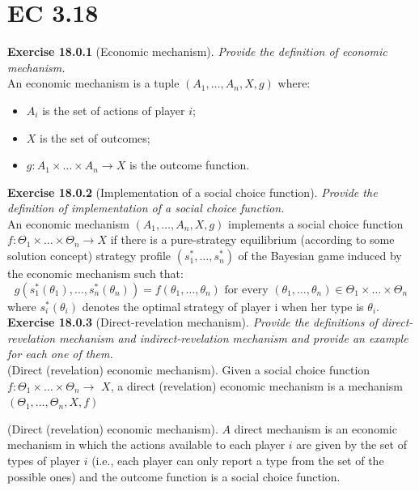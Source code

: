 \section{EC 3.18}

\textbf{Exercise 18.0.1} (Economic mechanism). \textit{Provide the definition of economic mechanism.}\\

An economic mechanism is a tuple $(A_1,\ldots,A_n,X,g)$ where:
\begin{itemize}
\item $A_i$ is the set of actions of player $i$;
\item $X$ is the set of outcomes;
\item $g: A_1 \times \ldots \times A_n\rightarrow X$ is the outcome function.
\end{itemize} 

\textbf{Exercise 18.0.2} (Implementation of a social choice function). \textit{Provide the definition of implementation of a social choice function.}\\

An economic mechanism $\left(A_{1}, \ldots, A_{n}, X, g\right)$ implements a social choice function $f: \Theta_{1} \times \ldots \times \Theta_{n} \rightarrow X$ if there is a pure-strategy equilibrium (according to
some solution concept) strategy profile $\left(s_{1}^{*}, \ldots, s_{n}^{*}\right)$ of the Bayesian game induced by the economic mechanism such that:
$$
g\left(s_{1}^{*}\left(\theta_{1}\right), \ldots, s_{n}^{*}\left(\theta_{n}\right)\right)=f\left(\theta_{1}, \ldots, \theta_{n}\right) \text { for every }\left(\theta_{1}, \ldots, \theta_{n}\right) \in \Theta_{1} \times \ldots \times \Theta_{n}
$$
where $s_{i}^{*}\left(\theta_{i}\right)$ denotes the optimal strategy of player i when her type is $\theta_{i}$.\\

\textbf{Exercise 18.0.3} (Direct-revelation mechanism). \textit{Provide the definitions of direct-revelation mechanism and indirect-revelation mechanism and provide an example for each one of them.}\\

(Direct (revelation) economic mechanism). Given a social choice function $f: \Theta_{1} \times \ldots \times \Theta_{n} \rightarrow$ $X$, a direct (revelation) economic mechanism is a mechanism $\left(\Theta_{1}, \ldots, \Theta_{n}, X, f\right)$

(Direct (revelation) economic mechanism). $A$ direct mechanism is an economic mechanism in which the actions available to each player $i$ are given by the set of types of player $i$ (i.e., each player can only report a type from the set of the possible ones) and the outcome function is a social choice function.

